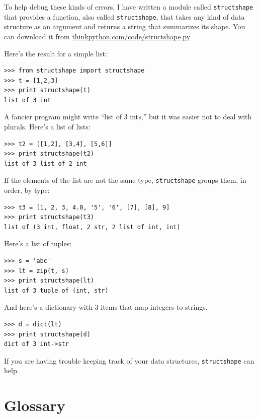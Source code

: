 \documentclass[10pt]{book}
\begin{document}

To help debug these kinds of errors, I have written a module
called {\tt structshape} that provides a function, also called
{\tt structshape}, that takes any kind of data structure as
an argument and returns a string that summarizes its shape.
You can download it from \url{thinkpython.com/code/structshape.py}

Here's the result for a simple list:

\beforeverb
\begin{verbatim}
>>> from structshape import structshape
>>> t = [1,2,3]
>>> print structshape(t)
list of 3 int
\end{verbatim}
\afterverb
%
A fancier program might write ``list of 3 int{\em s},'' but it
was easier not to deal with plurals.  Here's a list of lists:

\beforeverb
\begin{verbatim}
>>> t2 = [[1,2], [3,4], [5,6]]
>>> print structshape(t2)
list of 3 list of 2 int
\end{verbatim}
\afterverb
%
If the elements of the list are not the same type,
{\tt structshape} groups them, in order, by type:

\beforeverb
\begin{verbatim}
>>> t3 = [1, 2, 3, 4.0, '5', '6', [7], [8], 9]
>>> print structshape(t3)
list of (3 int, float, 2 str, 2 list of int, int)
\end{verbatim}
\afterverb
%
Here's a list of tuples:

\beforeverb
\begin{verbatim}
>>> s = 'abc'
>>> lt = zip(t, s)
>>> print structshape(lt)
list of 3 tuple of (int, str)
\end{verbatim}
\afterverb
%
And here's a dictionary with 3 items that map integers to strings.

\beforeverb
\begin{verbatim}
>>> d = dict(lt) 
>>> print structshape(d)
dict of 3 int->str
\end{verbatim}
\afterverb
%
If you are having trouble keeping track of your data structures,
{\tt structshape} can help.


\section{Glossary}
\end{document}

